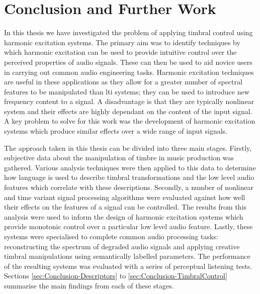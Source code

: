 \chapter{Conclusion and Further Work}
\label{chap:Conclusion}

	In this	thesis we have investigated the problem of applying timbral control using harmonic excitation systems. The
	primary aim was to identify techniques by which harmonic excitation can be used to provide intuitive control over
	the perceived properties of audio signals. These can then be used to aid novice users in carrying out common audio
	engineering tasks. Harmonic excitation techniques are useful in these applications as they allow for a greater
	number of spectral features to be manipulated than \acrshort{lti} systems; they can be used to introduce new
	frequency content to a signal. A disadvantage is that they are typically nonlinear system and their effects are
	highly dependant on the content of the input signal. A key problem to solve for this work was the development of
	harmonic excitation systems which produce similar effects over a wide range of input signals.

	The approach taken in this thesis can be divided into three main stages. Firstly, subjective data about the
	manipulation of timbre in music production was gathered. Various analysis techniques were then applied to this data
	to determine how language is used to describe timbral transformations and the low level audio features which
	correlate with these descriptions. Secondly, a number of nonlinear and time variant signal processing algorithms
	were evaluated against how well their effects on the features of a signal can be controlled. The results from this
	analysis were used to inform the design of harmonic excitation systems which provide monotonic control over a
	particular low level audio feature. Lastly, these systems were specialised to complete common audio processing
	tasks: reconstructing the spectrum of degraded audio signals and applying creative timbral manipulations using
	semantically labelled parameters. The performance of the resulting systems was evaluated with a series of perceptual
	listening tests. Sections \ref{sec:Conclusion-Descriptors} to \ref{sec:Conclusion-TimbralControl} summarise the main
	findings from each of these stages.


